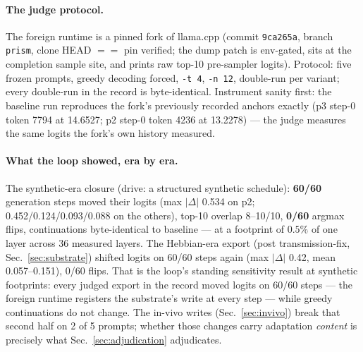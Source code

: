 \paragraph{The judge protocol.}
The foreign runtime is a pinned fork of llama.cpp (commit
\texttt{9ca265a}, branch \texttt{prism}, clone HEAD $==$ pin
verified; the dump patch is env-gated, sits at the completion sample
site, and prints raw top-10 pre-sampler logits). Protocol: five
frozen prompts, greedy decoding forced, \texttt{-t 4}, \texttt{-n
12}, double-run per variant; every double-run in the record is
byte-identical. Instrument sanity first: the baseline run reproduces
the fork's previously recorded anchors exactly (p3 step-0 token
7794 at 14.6527; p2 step-0 token 4236 at 13.2278) --- the judge
measures the same logits the fork's own history measured.

\paragraph{What the loop showed, era by era.}
The synthetic-era closure (drive: a structured synthetic schedule):
\textbf{60/60} generation steps moved their logits (max $|\Delta|$
0.534 on p2; 0.452/0.124/0.093/0.088 on the others), top-10 overlap
8--10/10, \textbf{0/60} argmax flips, continuations byte-identical to
baseline --- at a footprint of $0.5\%$ of one layer across 36
measured layers. The Hebbian-era export (post transmission-fix,
Sec.~\ref{sec:substrate}) shifted logits on 60/60 steps again (max
$|\Delta|$ 0.42, mean 0.057--0.151), 0/60 flips. That is the loop's
standing sensitivity result at synthetic footprints: every judged
export in the record moved logits on 60/60 steps --- the foreign
runtime registers the substrate's write at every step --- while
greedy continuations do
not change. The in-vivo writes (Sec.~\ref{sec:invivo}) break that
second half on 2 of 5 prompts; whether those changes carry adaptation
\emph{content} is precisely what Sec.~\ref{sec:adjudication}
adjudicates.
